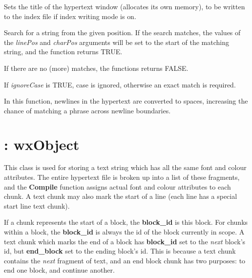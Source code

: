 

Sets the title of the hypertext window (allocates its own memory), to be written
to the index file if index writing mode is on.



Search for a string from the given position. If the search matches,
the values of the {\it linePos} and {\it charPos} arguments will be
set to the start of the matching string, and the function returns TRUE.

If there are no (more) matches, the functions returns FALSE.

If {\it ignoreCase} is TRUE, case is ignored, otherwise an exact match
is required.

In this function, newlines in the hypertext are converted to spaces, increasing
the chance of matching a phrase across newline boundaries.

\section{: wxObject}

This class is used for storing a text string which has all the
same font and colour attributes. The entire hypertext file is broken
up into a list of these fragments, and the {\bf Compile} function
assigns actual font and colour attributes to each chunk.
A text chunk may also mark the start of a line (each line has
a special start line text chunk).

If a chunk represents the start of a block, the {\bf block\_id} is
this block. For chunks within a block, the {\bf block\_id} is always
the id of the block currently in scope. A text chunk which marks the
end of a block has {\bf block\_id} set to the {\it next} block's id,
but {\bf end\_block} set to the ending block's id. This is because a
text chunk contains the {\it next} fragment of text, and an end block
chunk has two purposes: to end one block, and continue another.



